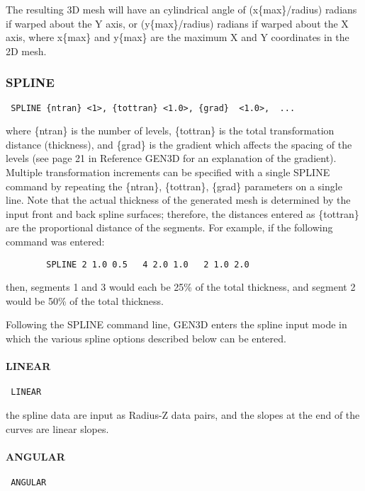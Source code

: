 The resulting 3D mesh will have an cylindrical angle of (x\{max\}/radius)
radians if warped about the Y axis, or (y\{max\}/radius) radians if warped
about the X axis, where x\{max\} and y\{max\} are the maximum X and Y
coordinates in the 2D mesh.
\subsubsection{SPLINE}
\begin{verbatim}
 SPLINE {ntran} <1>, {tottran} <1.0>, {grad}  <1.0>,  ...
\end{verbatim}

where \{ntran\} is the number of levels, \{tottran\} is the total
transformation distance (thickness), and \{grad\} is the gradient which
affects the spacing of the levels (see page 21 in Reference GEN3D
for an explanation of the gradient).  Multiple transformation increments
can be specified with a single SPLINE command by repeating the \{ntran\},
\{tottran\}, \{grad\} parameters on a single line.  Note that the actual
thickness of the generated mesh is determined by the input front and
back spline surfaces; therefore, the distances entered as \{tottran\} are
the proportional distance of the segments.  For example, if the
following command was entered:

\begin{verbatim}
        SPLINE 2 1.0 0.5   4 2.0 1.0   2 1.0 2.0
\end{verbatim}

then, segments 1 and 3 would each be 25\% of the total thickness, and
segment 2 would be 50\% of the total thickness.

Following the SPLINE command line, GEN3D enters the spline input mode in
which the various spline options described below can be entered.
\paragraph{LINEAR}
\begin{verbatim}
 LINEAR
\end{verbatim}

the spline data are input as Radius-Z data pairs, and the slopes at the
end of the curves are linear slopes.
\paragraph{ANGULAR}
\begin{verbatim}
 ANGULAR
\end{verbatim}

